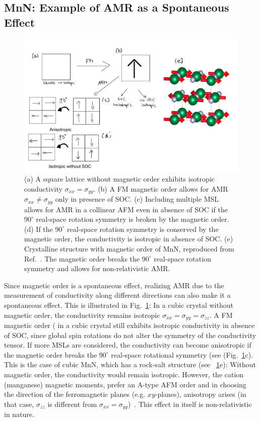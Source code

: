 \documentclass[prb,showpacs,amsmath,amssymb,superscriptaddress,twocolumn,floatfix]{revtex4-1}
\begin{document}
\subsection{MnN: Example of AMR as a Spontaneous Effect}
\label{sec_I_MnN}

\begin{figure}
	\centering
	\includegraphics[width=1\linewidth]{img/MnN_sketch}
	\caption{(a) A square lattice without magnetic order exhibits isotropic conductivity $\sigma_{xx} = \sigma_{yy}$. (b) A FM magnetic order allows for AMR $\sigma_{xx} \neq \sigma_{yy}$ only in presence of SOC. (c) Including multiple MSL allows for AMR in a collinear AFM even in absence of SOC if the $90^\circ$ real-space rotation symmetry is broken by the magnetic order. (d) If the $90^\circ$ real-space rotation symmetry is conserved by the magnetic order, the conductivity is isotropic in absence of SOC. (e) Crystalline structure with magnetic order of MnN, reproduced from Ref.~\cite{Dunz:2020}. The magnetic order breaks the $90^\circ$ real-space rotation symmetry and allows for non-relativistic AMR.}
	\label{fig:mnnsketch}
\end{figure}

Since magnetic order is a spontaneous effect, realizing AMR due to the measurement of conductivity along different directions can also make it a spontaneous effect. This is illustrated in Fig.~\ref{fig:mnnsketch}: In a cubic crystal without magnetic order, the conductivity remains isotropic $\sigma_{xx}=\sigma_{yy}=\sigma_{zz}$. A FM magnetic order ( in a cubic crystal still exhibits isotropic conductivity in absence of SOC, since global spin rotations do not alter the symmetry of the conductivity tensor. If more MSLs are considered, the conductivity can become anisotropic if the magnetic order breaks the $90^\circ$ real-space rotational symmetry (see (Fig.~\ref{fig:mnnsketch}c). This is the case of cubic MnN, which has a rock-salt structure (see ~\ref{fig:mnnsketch}e): Without magnetic order, the conductivity would remain isotropic. However, the cation (manganese) magnetic moments, prefer an A-type AFM order and in choosing
the direction of the ferromagnetic planes (e.g. $xy$-planes),
anisotropy arises (in that case, $\sigma_{zz}$ is different from
$\sigma_{xx}=\sigma_{yy}$)~\cite{Granville:2005}. This effect in itself is non-relativistic in nature.
\end{document}
